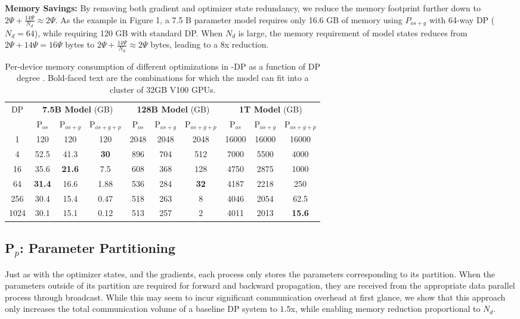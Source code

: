 \textbf{Memory Savings:} By removing both gradient and optimizer state redundancy, we reduce the memory footprint further down to $ 2 \Psi + \frac{14\Psi}{N_d} \approx 2 \Psi$. 
As the example in Figure 1, a 7.5 B parameter model requires only 16.6 GB of memory using $P_{os+g}$ with 64-way DP ($N_d = 64$), while requiring 120 GB with standard DP.
When $N_d$ is large,  the memory requirement of model states reduces from $2\Psi+14\Psi=16\Psi$ bytes to $ 2 \Psi + \frac{14 \Psi}{N_d} \approx 2 \Psi$ bytes, leading to a 8x reduction.
  \begin{table*}
        \centering
        \begin{tabular}{|c||c|c|c||c|c|c||c|c|c|}
        \hline
        \multicolumn{1}{|c}{\multirow{2}{*}{DP}}&\multicolumn{3}{||c}{\textbf{7.5B Model} (GB)} &\multicolumn{3}{||c}{\textbf{128B Model} (GB)} & \multicolumn{3}{||c|}{\textbf {1T Model} (GB)} \\
        \hhline{~---------}
        &P$_{os}$&P$_{os+g}$&P$_{os+g+p}$&P$_{os}$&P$_{os+g}$&P$_{os+g+p}$&P$_{os}$&P$_{os+g}$&P$_{os+g+p}$\\
        \hline
        1&120&120&120&2048&2048&2048&16000&16000&16000\\
        4&52.5&41.3&\textbf{30}&896&704&512&7000&5500&4000\\
        16&35.6&\textbf{21.6}&7.5&608&368&128&4750&2875&1000\\
        64&\textbf{31.4}&16.6&1.88&536&284&\textbf{32}&4187&2218&250\\
        256&30.4&15.4&0.47&518&263&8&4046&2054&62.5\\
        1024&30.1&15.1&0.12&513&257&2&4011&2013&\textbf{15.6}\\
        \hline
        \end{tabular}
     \caption{Per-device memory consumption of different optimizations in \name-DP as a function of DP degree . Bold-faced text are the combinations for which the model can fit into a cluster of 32GB V100 GPUs.}
     \label{tab:memory-consumption}
 \end{table*}

\subsection{P$_p$: Parameter Partitioning}\label{sec:pp}
Just as with the optimizer states, and the gradients, each process only stores the parameters corresponding to its partition. When the parameters outside of its partition are required for forward and backward propagation, they are received from the appropriate data parallel process through broadcast. While this may seem to incur significant communication overhead at first glance, we show that this approach only increases the total communication volume of a baseline DP system to $1.5$x, while enabling memory reduction proportional to $N_d$.

